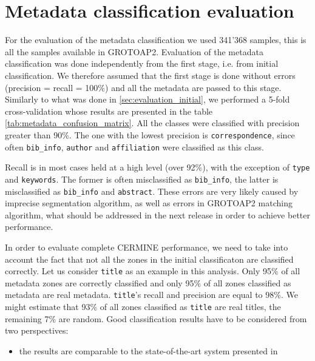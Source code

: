 \section{Metadata classification evaluation}
For the evaluation of the metadata classification we used 341'368 samples, this is all the samples available in GROTOAP2. Evaluation of the metadata classification was done independently from the first stage, i.e. from initial classification. We therefore assumed that the first stage is done without errors (precision = recall = 100\%) and all the metadata are passed to this stage. Similarly to what was done in \ref{sec:evaluation_initial}, we performed a 5-fold cross-validation whose results are presented in the table \ref{tab:metadata_confusion_matrix}. All the classes were classified with precision greater than 90\%. The one with the lowest precision is \verb+correspondence+, since often \verb+bib_info+, \verb+author+ and \verb+affiliation+ were classified as this class.

Recall is in most cases held at a high level (over 92\%), with the exception of \verb+type+ and \verb+keywords+. The former is often misclassified as \verb+bib_info+, the latter is misclassified as \verb+bib_info+ and \verb+abstract+. These errors are very likely caused by imprecise segmentation algorithm, as well as errors in GROTOAP2 matching algorithm, what should be addressed in the next release in order to achieve better performance.

In order to evaluate complete CERMINE performance, we need to take into account the fact that not all the zones in the initial classificaton are classified correctly. Let us consider \verb+title+ as an example in this analysis. Only 95\% of all metadata zones are correctly classified and only 95\% of all zones classified as metadata are real metadata. \verb+title+'s recall and precision are equal to 98\%. We might estimate that 93\% of all zones classified as \verb+title+ are real titles, the remaining 7\% are random.
\vspace{2cm}
Good classification results have to be considered from two perspectives:
\begin{itemize}
\item the results are comparable to the state-of-the-art system presented in \cite{Kern2012}
\end{itemize}


